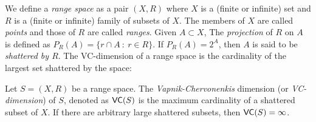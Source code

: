 %
We define a {\em range space} as a pair $(X,R)$ where $X$ is a (finite or infinite) set
 and $R$ is a (finite or infinite) family of subsets of $X$. The members of $X$
 are called {\em points} and those of $R$ are called {\em ranges}.
Given $A\subset X$, The {\em projection} of $R$ on
$A$ is defined as $P_R(A)=\{r\cap A ~:~ r\in R\}$.
%
If $P_R(A)=2^A$, then $A$ is said to be {\em shattered by $R$}.
The VC-dimension of a range space is the cardinality of the largest set
shattered by the space:
\begin{definition}\label{defn:VCdim}
  Let $S=(X,R)$ be a range space. The {\em Vapnik-Chervonenkis} dimension (or
  {\em VC-dimension}) of $S$, denoted as $\mathsf{VC}(S)$ is the maximum cardinality of
  a shattered subset of $X$. If there are arbitrary large shattered subsets,
  then $\mathsf{VC}(S)=\infty$.
\end{definition}

